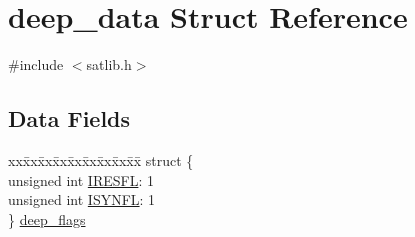 \hypertarget{structdeep__data}{\section{deep\-\_\-data Struct Reference}
\label{structdeep__data}
}


{\ttfamily \#include $<$satlib.\-h$>$}

\subsection*{Data Fields}
\begin{DoxyCompactItemize}
\item 
\begin{tabbing}
xx\=xx\=xx\=xx\=xx\=xx\=xx\=xx\=xx\=\kill
struct \{\\
\>unsigned int \hyperlink{structdeep__data_aa483e28efccb3251ed4ab9a8acc87cf1}{IRESFL}: 1\\
\>unsigned int \hyperlink{structdeep__data_a50c7c2c3f446f082e85caeebe42b6334}{ISYNFL}: 1\\
\} \hyperlink{structdeep__data_a000d674d79348a7f2df37166bc0c6852}{deep\_flags}\\


\end{tabbing}
\end{DoxyCompactItemize}
